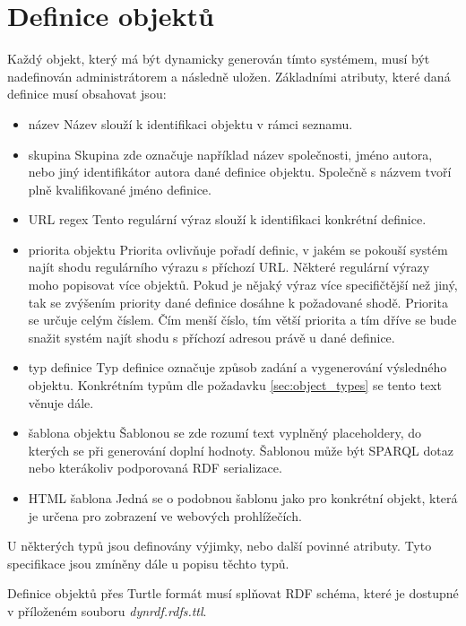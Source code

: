 \documentclass[thesis=B,czech]{FITthesis}[2012/06/26]
\begin{document}
 \section{Definice objektů}
  Každý objekt, který má být dynamicky generován tímto systémem, musí být nadefinován administrátorem a následně uložen.
  Základními atributy, které daná definice musí obsahovat jsou:
  \begin{itemize}
    \item název
      \subitem Název slouží k identifikaci objektu v rámci seznamu.
    \item skupina
      \subitem Skupina zde označuje například název společnosti, jméno autora, nebo jiný identifikátor autora dané definice objektu. 
      Společně s názvem tvoří plně kvalifikované jméno definice.
    \item URL regex
      \subitem Tento regulární výraz slouží k identifikaci konkrétní definice.
    \item priorita objektu
      \subitem Priorita ovlivňuje pořadí definic, v jakém se pokouší systém najít shodu regulárního výrazu s příchozí URL. Některé regulární
      výrazy moho popisovat více objektů. Pokud je nějaký výraz více specifičtější než jiný, tak se zvýšením priority dané definice dosáhne k požadované shodě.
      Priorita se určuje celým číslem. Čím menší číslo, tím větší priorita a tím dříve se bude snažit systém najít shodu s příchozí adresou právě u dané definice.
      
    \item typ definice
      \subitem Typ definice označuje způsob zadání a vygenerování výsledného objektu. Konkrétním typům dle požadavku \ref{sec:object_types} se tento text věnuje dále.
    \item šablona objektu
      \subitem Šablonou se zde rozumí text vyplněný placeholdery, do kterých se při generování doplní hodnoty. Šablonou může být SPARQL dotaz nebo kterákoliv 
      podporovaná RDF serializace.
      
    \item HTML šablona
      \subitem Jedná se o podobnou šablonu jako pro konkrétní objekt, která je určena pro zobrazení ve webových prohlížečích.    
 \end{itemize}
 U některých typů jsou definovány výjimky, nebo další povinné atributy. Tyto specifikace jsou zmíněny dále u popisu těchto typů.
 
 Definice objektů přes Turtle formát musí splňovat RDF schéma, které je dostupné v příloženém souboru \textit{dynrdf.rdfs.ttl}.
 
\end{document}
